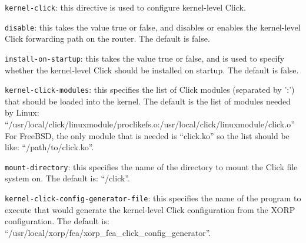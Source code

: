 \begin{description}
\begin{description}
\item{\tt kernel-click}: this directive is used to configure
  kernel-level Click.
\begin{description}
\item{\tt disable}: this takes the value {\stt true} or {\stt false},
  and disables or enables the kernel-level Click forwarding path on the
  router. The default is {\stt false}.
\item{\tt install-on-startup}: this takes the value {\stt true} or {\stt
  false}, and is used to specify whether the kernel-level Click should
  be installed on startup. The default is {\stt false}.
\item{\tt kernel-click-modules}: this specifies the list of Click
  modules (separated by ':') that should be loaded into the kernel.
  The default is the list of modules needed by Linux:
  ``/usr/local/click/linuxmodule/proclikefs.o:/usr/local/click/linuxmodule/click.o''
  For FreeBSD, the only module that is needed is ``click.ko'' so the
  list should be like: ``/path/to/click.ko''.
\item{\tt mount-directory}: this specifies the name of the directory to
  mount the Click file system on. The default is: ``/click''.
\item{\tt kernel-click-config-generator-file}: this specifies the name
  of the program to execute that would generate the kernel-level Click
  configuration from the XORP configuration. The default is:
  ``/usr/local/xorp/fea/xorp\_fea\_click\_config\_generator''.
\end{description}


\end{description}
\end{description}
